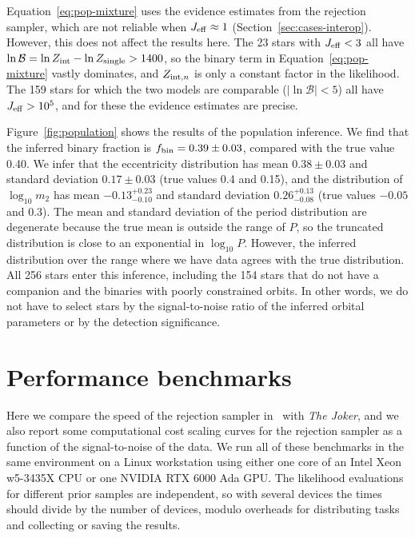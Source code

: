 \documentclass[twocolumn]{AASTeX7/aastex701}
\newcommand{\harv}{\package{harv}}
\newcommand{\joker}{\textsl{The Joker}}
\begin{document}
Equation~\ref{eq:pop-mixture} uses the evidence estimates from the rejection sampler,
which are not reliable when $J_{\rm eff} \approx 1$ (Section~\ref{sec:cases-interop}).
However, this does not affect the results here.
The 23 stars with $J_{\rm eff} < 3$ all have $\ln \mathcal{B} = \ln Z_{\rm int} - \ln
Z_{\rm single} > 1400$, so the binary term in Equation~\ref{eq:pop-mixture} vastly
dominates, and $Z_{{\rm int},n}$ is only a constant factor in the likelihood.
The 159 stars for which the two models are comparable ($|\ln \mathcal{B}| < 5$) all have
$J_{\rm eff} > 10^5$, and for these the evidence estimates are precise.

Figure~\ref{fig:population} shows the results of the population inference.
We find that the inferred binary fraction is $f_{\rm bin} = 0.39 \pm 0.03$, compared
with the true value 0.40.
We infer that the eccentricity distribution has mean $0.38 \pm 0.03$ and standard
deviation $0.17 \pm 0.03$ (true values 0.4 and 0.15), and the distribution of $\log_{10}
m_2$ has mean $-0.13^{+0.23}_{-0.10}$ and standard deviation $0.26^{+0.13}_{-0.08}$
(true values $-0.05$ and 0.3).
The mean and standard deviation of the period distribution are degenerate because the
true mean is outside the range of $P$, so the truncated distribution is close to an
exponential in $\log_{10} P$.
However, the inferred distribution over the range where we have data agrees with the
true distribution.
All 256 stars enter this inference, including the 154 stars that do not have a companion
and the binaries with poorly constrained orbits.
In other words, we do not have to select stars by the signal-to-noise ratio of the
inferred orbital parameters or by the detection significance.


\section{Performance benchmarks}
\label{sec:performance}

Here we compare the speed of the rejection sampler in \harv\ with \joker, and we also
report some computational cost scaling curves for the rejection sampler as a function of
the signal-to-noise of the data.
We run all of these benchmarks in the same environment on a Linux workstation using
either one core of an Intel Xeon w5-3435X CPU or one NVIDIA RTX 6000 Ada GPU.
The likelihood evaluations for different prior samples are independent, so with several
devices the times should divide by the number of devices, modulo overheads for
distributing tasks and collecting or saving the results.
\end{document}
